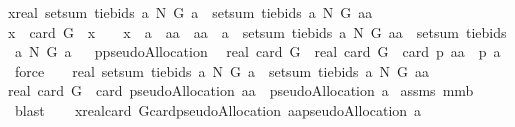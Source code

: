 \begin{isabellebody}
{\isachardoublequoteopen}x{\isacharequal}real\ {\isacharparenleft}setsum\ {\isacharparenleft}tiebids{\isacharprime}\ a\ N\ G{\isacharparenright}\ a{\isacharparenright}\ {\isacharminus}\ setsum\ {\isacharparenleft}tiebids{\isacharprime}\ a\ N\ G{\isacharparenright}\ aa{\isachardoublequoteclose}\ \isanewline
{\isachardoublequoteopen}x\ {\isacharless}{\isacharequal}\ card\ G\ {\isacharampersand}\ x\ {\isasymge}\ {}\ {\isacharampersand}\ {\isacharparenleft}x{\isacharequal}{}\ {\isasymlongleftrightarrow}\ a\ {\isacharequal}\ aa{\isacharparenright}\ {\isacharampersand}\ {\isacharparenleft}aa\ {\isasymnoteq}\ a\ {\isasymlongrightarrow}\ setsum\ {\isacharparenleft}tiebids{\isacharprime}\ a\ N\ G{\isacharparenright}\ aa\ {\isacharless}\ setsum\ {\isacharparenleft}tiebids{\isacharprime}\ a\ N\ G{\isacharparenright}\ a{\isacharparenright}{\isachardoublequoteclose}\isanewline
%
\isadelimproof
%
\endisadelimproof
%
\isatagproof
{}\isamarkupfalse%
\ {\isacharminus}\isanewline
{}\isamarkupfalse%
\ {\isacharquery}p{\isacharequal}pseudoAllocation\ \isamarkupfalse%
\ {\isachardoublequoteopen}real\ {\isacharparenleft}card\ G{\isacharparenright}\ {\isachargreater}{\isacharequal}\ real\ {\isacharparenleft}card\ G{\isacharparenright}\ {\isacharminus}\ card\ {\isacharparenleft}{\isacharquery}p\ aa\ {\isasyminter}\ {\isacharparenleft}{\isacharquery}p\ a{\isacharparenright}{\isacharparenright}{\isachardoublequoteclose}\ \isamarkupfalse%
\ force\isanewline
{}\isamarkupfalse%
\ \isamarkupfalse%
\ \isanewline
{\isachardoublequoteopen}real\ {\isacharparenleft}setsum\ {\isacharparenleft}tiebids{\isacharprime}\ a\ N\ G{\isacharparenright}\ a{\isacharparenright}\ {\isacharminus}\ setsum\ {\isacharparenleft}tiebids{\isacharprime}\ a\ N\ G{\isacharparenright}\ aa\ {\isacharequal}\ \isanewline
real\ {\isacharparenleft}card\ G{\isacharparenright}\ {\isacharminus}\ card\ {\isacharparenleft}pseudoAllocation\ aa\ {\isasyminter}\ {\isacharparenleft}pseudoAllocation\ a{\isacharparenright}{\isacharparenright}{\isachardoublequoteclose}\isanewline
{}\isamarkupfalse%
\ assms\ mm{}{}b\ \isamarkupfalse%
\ blast\ \isamarkupfalse%
\ \isamarkupfalse%
\isanewline
{}{\isacharcolon}\ {\isachardoublequoteopen}x{\isacharequal}real{\isacharparenleft}card\ G{\isacharparenright}{\isacharminus}card{\isacharparenleft}pseudoAllocation\ aa{\isasyminter}{\isacharparenleft}pseudoAllocation\ a{\isacharparenright}{\isacharparenright}{\isachardoublequoteclose}\ \isamarkupfalse%

\end{isabellebody}
